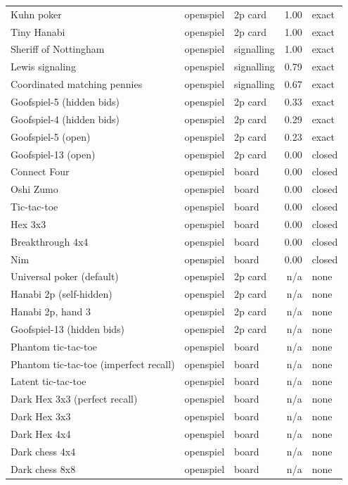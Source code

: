 \begin{longtable}{l l l r l}
Kuhn poker & openspiel & 2p card & 1.00 & exact \\
Tiny Hanabi & openspiel & 2p card & 1.00 & exact \\
Sheriff of Nottingham & openspiel & signalling & 1.00 & exact \\
Lewis signaling & openspiel & signalling & 0.79 & exact \\
Coordinated matching pennies & openspiel & signalling & 0.67 & exact \\
Goofspiel-5 (hidden bids) & openspiel & 2p card & 0.33 & exact \\
Goofspiel-4 (hidden bids) & openspiel & 2p card & 0.29 & exact \\
Goofspiel-5 (open) & openspiel & 2p card & 0.23 & exact \\
Goofspiel-13 (open) & openspiel & 2p card & 0.00 & closed \\
Connect Four & openspiel & board & 0.00 & closed \\
Oshi Zumo & openspiel & board & 0.00 & closed \\
Tic-tac-toe & openspiel & board & 0.00 & closed \\
Hex 3x3 & openspiel & board & 0.00 & closed \\
Breakthrough 4x4 & openspiel & board & 0.00 & closed \\
Nim & openspiel & board & 0.00 & closed \\
Universal poker (default) & openspiel & 2p card & n/a & none \\
Hanabi 2p (self-hidden) & openspiel & 2p card & n/a & none \\
Hanabi 2p, hand 3 & openspiel & 2p card & n/a & none \\
Goofspiel-13 (hidden bids) & openspiel & 2p card & n/a & none \\
Phantom tic-tac-toe & openspiel & board & n/a & none \\
Phantom tic-tac-toe (imperfect recall) & openspiel & board & n/a & none \\
Latent tic-tac-toe & openspiel & board & n/a & none \\
Dark Hex 3x3 (perfect recall) & openspiel & board & n/a & none \\
Dark Hex 3x3 & openspiel & board & n/a & none \\
Dark Hex 4x4 & openspiel & board & n/a & none \\
Dark chess 4x4 & openspiel & board & n/a & none \\
Dark chess 8x8 & openspiel & board & n/a & none \\

\end{longtable}
